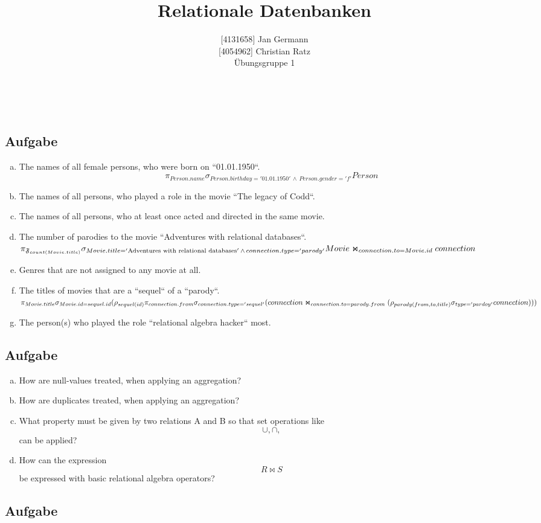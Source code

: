 \documentclass[11pt,a4paper,DIV=9]{scrartcl}
\author{{[}4131658{]} Jan Germann \\{[}4054962{]} Christian Ratz\\Übungsgruppe 1}
\title{Relationale Datenbanken}
\newcounter{temp}
\newcommand{\aufgabe}[1]{
  \setcounter{temp}{\value{subsection}}
  \setcounter{subsection}{#1}
  \addtocounter{subsection}{-1}
  \subsection{Aufgabe}
  \setcounter{subsection}{\value{temp}}
}
\renewcommand{\author}[1]{\renewcommand{\author}{#1}}
\renewcommand{\title}[1]{\renewcommand{\title}{#1}}
\newcommand{\makehomeworktitle}{
  \begin{minipage}[t]{6.5cm}
    \sf{\author}
  \end{minipage}
  \begin{minipage}[t]{6.5cm}
    \begin{flushright}
      \sf{\title\\\today}
    \end{flushright}
  \end{minipage}
  \\[0.2cm]
  \begin{center}
    \sf{
      \color{blue}{
        \LARGE{Aufgabenblatt \blattnr}
      }
    }
  \end{center}
  \vspace{0.1cm}
}
\begin{document}
\makehomeworktitle
\aufgabe{1}
  \begin{enumerate}[a)]
   \item The names of all female persons, who were born on ``01.01.1950``.
    \[ \pi_{Person.name} \sigma_{Person.birthday = '01.01.1950'\,\wedge\,Person.gender = 'f'}Person \]
   \item The names of all persons, who played a role in the movie ``The legacy of Codd``.
   \item The names of all persons, who at least once acted and directed in the same movie.
   \item The number of parodies to the movie ``Adventures with relational databases``.
    $ \pi_{\mathfrak{F}_{count(Movie.title)}} \\
    \sigma_{Movie.title = '\textrm{Adventures with relational databases}' \,\wedge\, connection.type = 'parody'}\\ Movie\Join_{connection.to = Movie.id}connection $

   \item Genres that are not assigned to any movie at all.
   \item The titles of movies that are a ``sequel`` of a ``parody``. \\
    $\pi_{Movie.title} \\
    \sigma_{Movie.id = sequel.id} \\
    (\rho_{sequel(id)}\\
    \pi_{connection.from}\sigma_{connection.type='sequel'}\\
    (connection \Join_{connection.to = parody.from} \\ 
      (\rho_{parody(from,to,title)}\sigma_{type='pardoy'}connection)\\
    )\\
    )$


   \item The person(s) who played the role ``relational algebra hacker`` most.
  \end{enumerate}

\aufgabe{2}
  \begin{enumerate}[a)]
   \item How are null-values treated, when applying an aggregation?
   \item How are duplicates treated, when applying an aggregation?
   \item What property must be given by two relations A and B so that set operations like \begin{displaymath}
  \cup, \cap,    \end{displaymath} can be applied?
  \item How can the expression \begin{displaymath}R \Join S\end{displaymath} be expressed with basic relational algebra operators?
  \end{enumerate}

\aufgabe{3}
\end{document}
